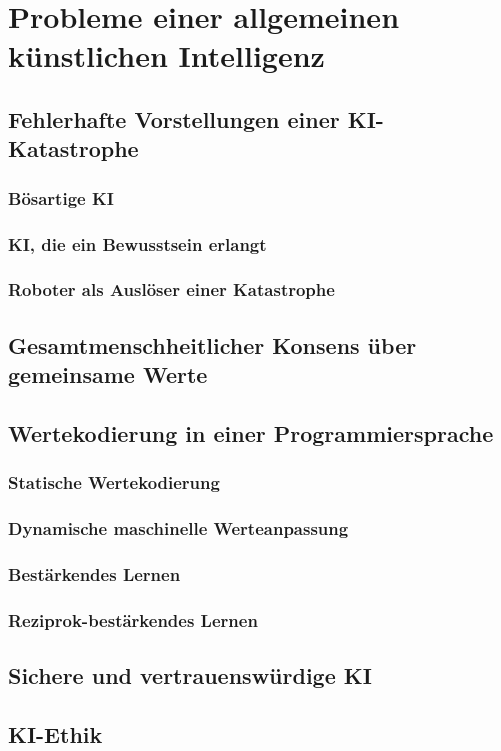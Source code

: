 \chapter{Probleme einer allgemeinen künstlichen Intelligenz}
\section{Fehlerhafte Vorstellungen einer KI-Katastrophe}
\subsection{Bösartige KI}
\subsection{KI, die ein Bewusstsein erlangt}
\subsection{Roboter als Auslöser einer Katastrophe}
\section{Gesamtmenschheitlicher Konsens über gemeinsame Werte}
\section{Wertekodierung in einer Programmiersprache}
\subsection{Statische Wertekodierung}
\subsection{Dynamische maschinelle Werteanpassung}
\subsection{Bestärkendes Lernen}
\subsection{Reziprok-bestärkendes Lernen}
\section{Sichere und vertrauenswürdige KI}
\section{KI-Ethik}
